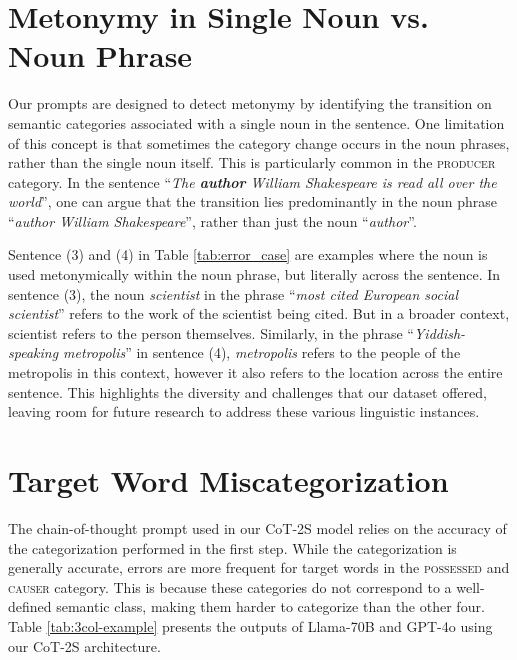 \documentclass[11pt]{article}
\begin{document}
\section{Metonymy in Single Noun vs. Noun Phrase}
\label{app:bothmet}
Our prompts are designed to detect metonymy by identifying the transition on semantic categories associated with a  single noun in the sentence. One limitation of this concept is that sometimes the category change occurs in the noun phrases, rather than the single noun itself. This is particularly common in the \textsc{producer} category. In the sentence ``\textit{The \textbf{author} William Shakespeare is read all over the world}'', one can argue that the transition lies predominantly in the noun phrase ``\textit{author William Shakespeare}'', rather than just the noun ``\textit{author}''. 

Sentence (3) and (4) in Table \ref{tab:error_case} are examples where the noun is used metonymically within the noun phrase, but literally across the sentence. In sentence (3), the noun \textit{scientist} in the phrase ``\textit{most cited European social scientist}'' refers to the work of the scientist being cited. But in a broader context, scientist refers to the person themselves. Similarly, in the phrase ``\textit{Yiddish-speaking metropolis}'' in sentence (4), \textit{metropolis} refers to the people of the metropolis in this context, however it also refers to the location across the entire sentence. This highlights the diversity and challenges that our dataset offered, leaving room for future research to address these various linguistic instances. 

\section{Target Word Miscategorization}

The chain-of-thought prompt used in our CoT-2S model relies on the accuracy of the categorization performed in the first step. While the categorization is generally accurate, errors are more frequent for target words in the \textsc{possessed} and \textsc{causer} category. This is because these categories do not correspond to a well-defined semantic class, making them harder to categorize than the other four. Table \ref{tab:3col-example} presents the outputs of Llama-70B and GPT-4o using our CoT-2S architecture. 
\end{document}
